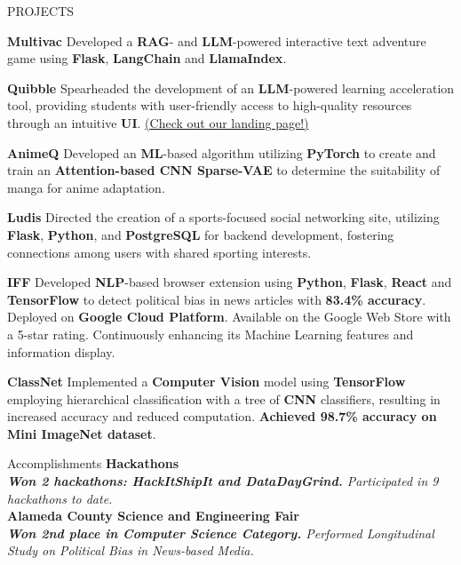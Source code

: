 \documentclass{resume} %
\begin{document}

\begin{rSection}{PROJECTS}
\vspace{-1em}
\item \textbf{Multivac} {Developed a \textbf{RAG}- and \textbf{LLM}-powered interactive text adventure game using \textbf{Flask}, \textbf{LangChain} and \textbf{LlamaIndex}.}
\vspace{-1.75mm}
\item \textbf{Quibble} {Spearheaded the development of an \textbf{LLM}-powered learning acceleration tool, providing students with user-friendly access to high-quality resources through an intuitive \textbf{UI}.} \href{https://quibble.webflow.io/}{(Check out our landing page!)}
\vspace{-1.75mm}
\item \textbf{AnimeQ} {Developed an \textbf{ML}-based algorithm utilizing \textbf{PyTorch} to create and train an \textbf{Attention-based CNN Sparse-VAE} to determine the suitability of manga for anime adaptation.}
\vspace{-1.75mm}
\item \textbf{Ludis} {Directed the creation of a sports-focused social networking site, utilizing \textbf{Flask}, \textbf{Python}, and \textbf{PostgreSQL} for backend development, fostering connections among users with shared sporting interests.}
\vspace{-1.75mm}
\item \textbf{IFF} {Developed \textbf{NLP}-based browser extension using \textbf{Python}, \textbf{Flask}, \textbf{React} and \textbf{TensorFlow} to detect political bias in news articles with \textbf{83.4\% accuracy}. Deployed on \textbf{Google Cloud Platform}. Available on the Google Web Store with a 5-star rating. Continuously enhancing its Machine Learning features and information display.}
\vspace{-1.75mm}
\item \textbf{ClassNet} {Implemented a \textbf{Computer Vision} model using \textbf{TensorFlow} employing hierarchical classification with a tree of \textbf{CNN} classifiers, resulting in increased accuracy and reduced computation. \textbf{Achieved 98.7\% accuracy on Mini ImageNet dataset}.}
\end{rSection} 

\begin{rSection}{Accomplishments} 
\textbf{Hackathons}\\
\textit{\textbf{Won 2 hackathons: HackItShipIt and DataDayGrind.} Participated in 9 hackathons to date. } \\
\textbf{Alameda County Science and Engineering Fair}\\
\textit{\textbf{Won 2nd place in Computer Science Category.} Performed Longitudinal Study on Political Bias in News-based Media.}

\end{rSection}
\end{document}
